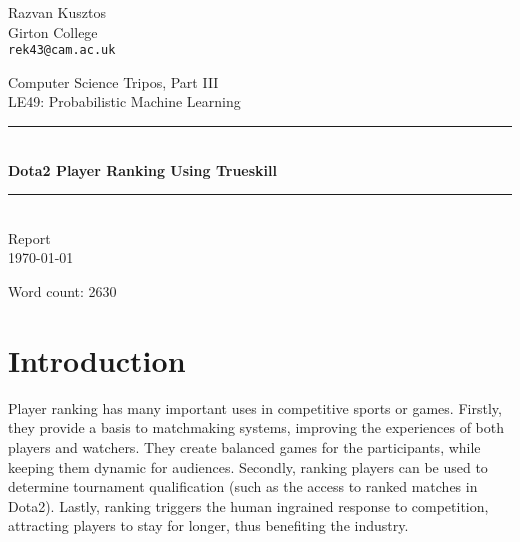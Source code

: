 \documentclass[10pt,a4]{article}
\begin{document}


\thispagestyle{empty}

\newcommand{\HRulee}{\rule{\linewidth}{0.5mm}}

\vfil

{\raggedleft \large Razvan Kusztos \\}
{\raggedleft \large Girton College \\}
{\raggedleft \large \tt rek43@cam.ac.uk \\}

\vspace{50pt}

\begin{center}

	{\Large \sc Computer Science Tripos, Part III \\}
	\vspace{10pt}
	{\Large \sc LE49: Probabilistic Machine Learning\\}
	\vspace{20pt}
	\HRulee \\[0.1cm]
	\vspace{10pt}
	{\LARGE \bf Dota2 Player Ranking Using Trueskill\texttrademark}
	\HRulee \\[20pt]
	{\LARGE  Report\\}
	\vspace{20pt}
	{\Large \today \\}
	\vspace{40pt}
\end{center}

\vfill

\begin{flushright}
Word count: 2630
\end{flushright}
	
\newpage

\section{Introduction}

Player ranking has many important uses in competitive sports or games. Firstly, 
they provide a basis to matchmaking systems, improving the experiences of both 
players and watchers. They create balanced games for the participants, while 
keeping them dynamic for audiences. Secondly, ranking players can be used to determine 
tournament qualification (such as the access to ranked matches in Dota2). Lastly, 
ranking triggers the human ingrained response to competition, attracting players 
to stay for longer, thus benefiting the industry.
\end{document}
